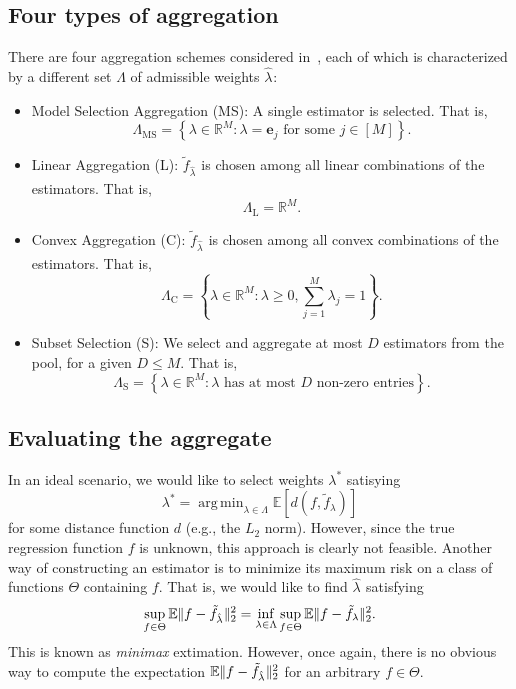 \documentclass[11pt, letter paper]{article}
\newcommand{\1}{\mathmybb{1}}
\DeclareMathOperator*{\argmin}{arg\,min}
\newcommand{\R}{\mathbb{R}}
\newcommand{\0}{\emptyset}
\newcommand{\E}{\mathbb{E}}
\newcommand{\Ep}[1]{\mathbb{E}\left[ #1 \right]}
\newcommand{\paren}[1]{\left(#1 \right)}
\newcommand{\set}[1]{\left\{ #1 \right\}}
\newcommand{\norm}[1]{|\hspace{-1pt}|#1 |\hspace{-1pt}|}
\newcommand{\normsq}[1]{\norm{#1}^{2}}
\newcommand{\ftilde}[1]{\tilde{f}_{#1}}
\newcommand{\lambdahat}[1]{\hat{\lambda}_{#1}}
\begin{document}
\subsection{Four types of aggregation}

There are four aggregation schemes considered in~\textcite{bunea_2007}, each of which is characterized by a different set \(\Lambda\) of admissible weights \(\lambdahat{}\):
\begin{itemize}
    \item Model Selection Aggregation (MS): A single estimator is selected. That is,\[\Lambda_{\mathrm{MS}} = \set{\lambda\in\R^{M}:\lambda = \boldsymbol{e}_{j}\text{ for some }j\in[M]}.\]
    \item Linear Aggregation (L): \(\ftilde{\lambdahat{}}\) is chosen among all linear combinations of the estimators. That is, \[\Lambda_{\mathrm{L}} = \R^{M}.\]
    \item Convex Aggregation (C): \(\ftilde{\lambdahat{}}\) is chosen among all convex combinations of the estimators. That is, \[\Lambda_{\mathrm{C}} = \set{\lambda\in\R^{M}:\lambda\geq 0, \sum_{j=1}^{M}\lambda_{j} = 1}.\]
    \item Subset Selection (S): We select and aggregate at most \(D\) estimators from the pool, for a given \(D\leq M\). That is, \[\Lambda_{\mathrm{S}} = \set{\lambda\in\R^{M}:\lambda\text{ has at most \(D\) non-zero entries}}.\]
\end{itemize}

\subsection{Evaluating the aggregate}

In an ideal scenario, we would like to select  weights \(\lambda^*\) satisying 
\[\lambda^{*} = \argmin_{\lambda\in\Lambda}\Ep{d\paren{f, \ftilde{\lambda}}}\]
for some distance function \(d\) (e.g., the \(L_{2}\) norm). However, since the true regression function \(f\) is unknown, this approach is clearly not feasible. Another way of constructing an estimator is to minimize its maximum risk on a class of functions \(\Theta\) containing \(f\). That is, we would like to find \(\lambdahat{}\) satisfying 
\[\sup_{f\in\Theta}\E\normsq{f-\ftilde{\lambdahat{}}}_{2} = \inf_{\lambda\in\Lambda}\sup_{f\in\Theta}\E\normsq{f-\ftilde{\lambda}}_{2}.\]
This is known as \emph{minimax} extimation. 
However, once again, there is no obvious way to compute the expectation \(\E\normsq{f-\ftilde{\lambdahat{}}}_{2}\) for an arbitrary \(f\in\Theta\).
\end{document}
